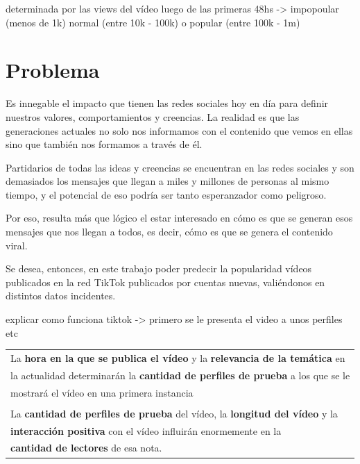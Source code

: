 \documentclass{article}
\begin{document}
determinada por las views del vídeo luego de las primeras 48hs -> impopoular (menos de 1k) normal (entre 10k - 100k) o popular (entre 100k - 1m)

\section{Problema}

Es innegable el impacto que tienen las redes sociales hoy en día para definir nuestros valores, 
comportamientos y creencias. La realidad es que las generaciones actuales no solo nos informamos
con el contenido que vemos en ellas sino que también nos formamos a través de él.

Partidarios de todas las ideas y creencias se encuentran en las redes sociales y son demasiados
los mensajes que llegan a miles y millones de personas al mismo tiempo, y el potencial de eso
podría ser tanto esperanzador como peligroso. 

Por eso, resulta
más que lógico el estar interesado en cómo es que se generan esos mensajes que nos llegan a todos,
es decir,
cómo es que se genera el contenido viral.

Se desea, entonces, en este trabajo poder predecir la popularidad vídeos publicados en la red TikTok
publicados por cuentas nuevas, 
valiéndonos en distintos datos incidentes. 


explicar como funciona tiktok -> primero se le presenta el video a unos perfiles etc


\begin{center}
	\begin{tabular}{|l}
	La \textbf{hora en la que se publica el vídeo} y la \textbf{relevancia de la temática} en \\
	la actualidad determinarán la \textbf{cantidad de perfiles de prueba} a los que se le \\
	mostrará el vídeo en una primera instancia\\\\

	La \textbf{cantidad de perfiles de prueba} del vídeo, la \textbf{longitud del vídeo} y la \\
	\textbf{interacción positiva} con el vídeo influirán enormemente en la \\ \textbf{cantidad de lectores} de esa nota.
	\end{tabular}
\end{center}
\end{document}
